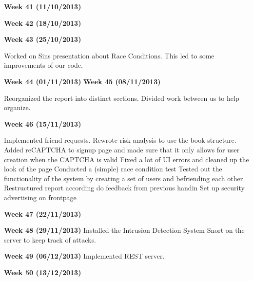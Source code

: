 \textbf{Week 41 (11/10/2013)}


\textbf{Week 42 (18/10/2013)}


\textbf{Week 43 (25/10/2013)}

Worked on Sins presentation about Race Conditions. This led to some improvements of our code.

\textbf{Week 44 (01/11/2013)}
\textbf{Week 45 (08/11/2013)}

Reorganized the report into distinct sections.
Divided work between us to help organize.

\textbf{Week 46 (15/11/2013)}

Implemented friend requests.
Rewrote risk analysis to use the book structure.
Added reCAPTCHA to signup page and made sure that it only allows for user creation when the CAPTCHA is valid
Fixed a lot of UI errors and cleaned up the look of the page
Conducted a (simple) race condition test
Tested out the functionality of the system by creating a set of users and befriending each other
Restructured report according do feedback from previous handin
Set up security advertising on frontpage

\textbf{Week 47 (22/11/2013)}

\textbf{Week 48 (29/11/2013)}
Installed the Intrusion Detection System Snort on the server to keep track of attacks.

\textbf{Week 49 (06/12/2013)}
Implemented REST server.

\textbf{Week 50 (13/12/2013)}


